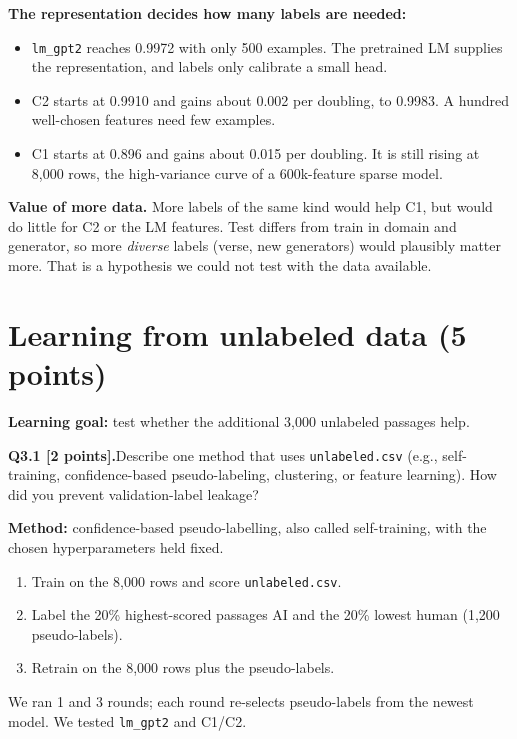 \documentclass[11pt,letterpaper]{article}
\newcommand{\question}[2]{\needspace{4\baselineskip}\par\addvspace{0.45em}\noindent\textbf{#1}\quad #2\par\nobreak\vspace{0.1em}}
\begin{document}
\textbf{The representation decides how many labels are needed:}
\begin{itemize}
\item \texttt{lm\_gpt2} reaches 0.9972 with only 500 examples. The pretrained LM supplies the representation, and labels only calibrate a small head.
\item C2 starts at 0.9910 and gains about 0.002 per doubling, to 0.9983. A hundred well-chosen features need few examples.
\item C1 starts at 0.896 and gains about 0.015 per doubling. It is still rising at 8,000 rows, the high-variance curve of a 600k-feature sparse model.
\end{itemize}

\textbf{Value of more data.} More labels of the same kind would help C1, but would do little for C2 or the LM features. Test differs from train in domain and generator, so more \emph{diverse} labels (verse, new generators) would plausibly matter more. That is a hypothesis we could not test with the data available.

\section{Learning from unlabeled data (5 points)}
\textbf{Learning goal:} test whether the additional 3,000 unlabeled passages help.
\question{Q3.1 [2 points].}{Describe one method that uses \texttt{unlabeled.csv} (e.g., self-training, confidence-based pseudo-labeling, clustering, or feature learning). How did you prevent validation-label leakage?}
\textbf{Method:} confidence-based pseudo-labelling, also called self-training, with the chosen hyperparameters held fixed.
\begin{enumerate}
\item Train on the 8,000 rows and score \texttt{unlabeled.csv}.
\item Label the 20\% highest-scored passages AI and the 20\% lowest human (1,200 pseudo-labels).
\item Retrain on the 8,000 rows plus the pseudo-labels.
\end{enumerate}
We ran 1 and 3 rounds; each round re-selects pseudo-labels from the newest model. We tested \texttt{lm\_gpt2} and C1/C2.
\end{document}
